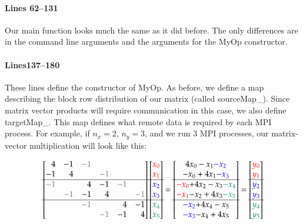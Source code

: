\documentclass[pdf,12pt,report,strict]{SANDreport}
\begin{document}
\paragraph{Lines 62--131}
Our main function looks much the same as it did before.  The only differences
are in the command line arguments and the arguments for the MyOp constructor.

\paragraph{Lines137--180}
These lines define the constructor of MyOp.  As before, we define a map
describing the block row distribution of our matrix (called sourceMap\_).  Since
matrix vector products will require communication in this case, we also define
targetMap\_.  This map defines what remote data is required by each MPI process. 
For example, if $n_x = 2$, $n_y = 3$, and we run 3 MPI processes, our
matrix-vector multiplication will look like this:

\begin{equation*}
\begin{bmatrix*}[r]
4 & -1 & \color{gray}-1\\
-1 & 4 &  & \color{gray}-1\\
\hline 
\color{gray}-1 &  & 4 & -1 & \color{gray}-1\\
 & \color{gray}-1 & -1 & 4 &  & \color{gray}-1\\
\hline 
 &  & \color{gray}-1 &  & 4 & -1\\
 &  &  & \color{gray}-1 & -1 & 4\\
\end{bmatrix*}
\begin{bmatrix*}
\color{red}x_0 \\
\color{red}x_1 \\
\hline
\color{blue} x_2 \\
\color{blue} x_3 \\
\hline
\color{PineGreen}x_4 \\
\color{PineGreen}x_5
\end{bmatrix*}
=
\begin{bmatrix*}
\textcolor{black}{4x_0-x_1}\textcolor{blue}{-x_2} \\
\textcolor{black}{-x_0+4x_1}\textcolor{blue}{-x_3} \\
\hline
\textcolor{red}{-x_0}\textcolor{black}{+4x_2-x_3}\textcolor{PineGreen}{-x_4}
\\
\textcolor{red}{-x_1}\textcolor{black}{-x_2+4x_3}\textcolor{PineGreen}{-x_5}
\\
\hline
\textcolor{blue}{-x_2}\textcolor{black}{+4x_4-x_5}
\\
\textcolor{blue}{-x_3}\textcolor{black}{-x_4+4x_5}
\end{bmatrix*}
=
\begin{bmatrix*}
\color{red}y_0 \\
\color{red}y_1 \\
\hline
\color{blue}y_2 \\
\color{blue}y_3 \\
\hline
\color{PineGreen}y_4 \\
\color{PineGreen}y_5
\end{bmatrix*}
\end{equation*}
\end{document}
